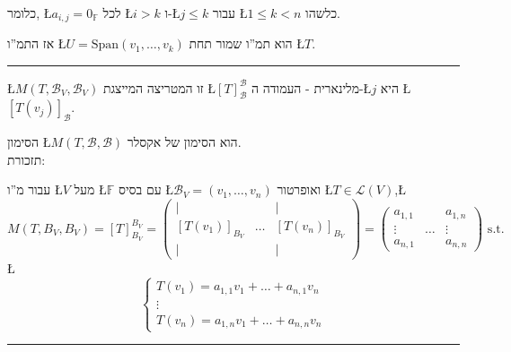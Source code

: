 \documentclass[english,hebrew]{article}
\begin{document}
כלומר, \L{$a_{i,j}=0_{\mathbb{F}}$} לכל \L{$i>k$} ו-\L{$j\le k$}
עבור \L{$1\le k<n$} כלשהו.

אז התמ\textquotedblright ו \L{$U=\text{Span}(v_{1},\dots,v_{k})$}
הוא תמ\textquotedblright ו שמור תחת \L{$T$}.

\rule[0.5ex]{1\columnwidth}{1pt}

\L{$M(T,\mathcal{B}_{V},\mathcal{B}_{V})$} זו המטריצה המייצגת \L{$\left[T\right]_{\mathcal{B}}^{\mathcal{B}}$}
מלינארית {\endL} - העמודה ה-\L{$j$} היא \L{$\left[T\left(v_{j}\right)\right]_{\mathcal{B}}$}. 

הסימון \L{$M\left(T,\mathcal{B},\mathcal{B}\right)$} הוא הסימון של
אקסלר.\\

תזכורת:

עבור מ\textquotedblright ו \L{$V$} מעל \L{$\mathbb{F}$} עם בסיס
\L{$\mathcal{B}_{V}=\left(v_{1},\dots,v_{n}\right)$} ואופרטור \L{$T\in\mathcal{L}(V)$},\L{%
\[
M(T,B_{V},B_{V})=[T]_{B_{V}}^{B_{V}}=\begin{pmatrix}| &  & |\\
\left[T\left(v_{1}\right)\right]_{B_{V}} & \dots & \left[T\left(v_{n}\right)\right]_{B_{V}}\\
| &  & |
\end{pmatrix}=\begin{pmatrix}a_{1,1} &  & a_{1,n}\\
\vdots & \dots & \vdots\\
a_{n,1} &  & a_{n,n}
\end{pmatrix}\text{ s.t.}
\]
}%
\L{%
\[
\begin{cases}
T(v_{1})=a_{1,1}v_{1}+\dots+a_{n,1}v_{n}\\
\vdots\\
T(v_{n})=a_{1,n}v_{1}+\dots+a_{n,n}v_{n}
\end{cases}
\]
}%

\rule[0.5ex]{1\columnwidth}{1pt}
\end{document}
